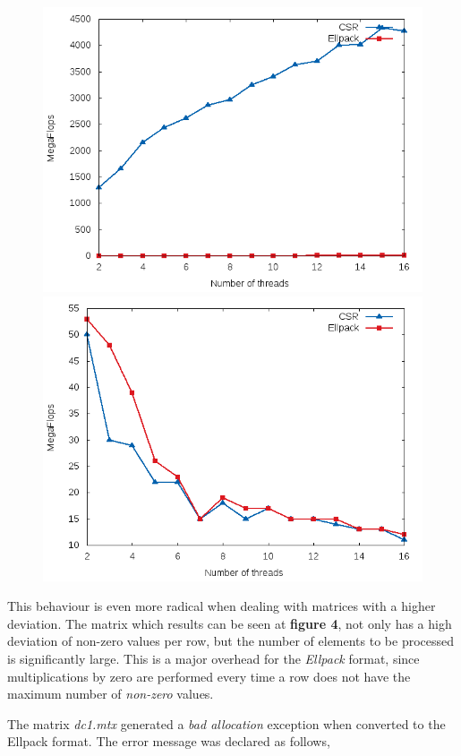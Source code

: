 \documentclass[12pt]{article}
\begin{document}
\begin{figure}[!htb]
\centering
\begin{minipage}{.5\textwidth}
	\centering
	\includegraphics[width=.8\linewidth]{OMP_1M.png}
\end{minipage}%
\begin{minipage}{.5\textwidth}
	\centering
  	\includegraphics[width=.8\linewidth]{OMP_cage4.png}
\end{minipage}
\end{figure}

\par This behaviour is even more radical when dealing with matrices with a higher deviation. The matrix which results can be seen at \textbf{figure 4}, not only has a high deviation of non-zero values per row, but the number of elements to be processed is significantly large. This is a major overhead for the \textit{Ellpack} format, since multiplications by zero are performed every time a row does not have the maximum number of \textit{non-zero} values.
\par The matrix \textit{dc1.mtx} generated a \textit{bad allocation} exception when converted to the Ellpack format. The error message was declared as follows, 
\end{document}

